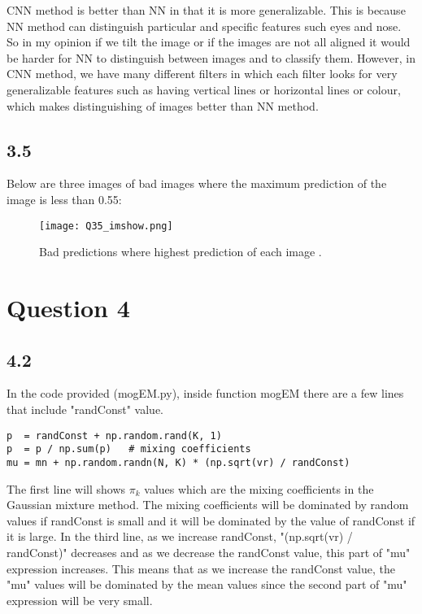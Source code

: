\documentclass[10pt]{article}
\begin{document}
CNN method is better than NN in that it is more generalizable. This is because NN method can distinguish particular and specific features such eyes and nose. So in my opinion if we tilt the image or if the images are not all aligned it would be harder for NN to distinguish between images and to classify them. However, in CNN method, we have many different filters in which each filter looks for very generalizable features such as having vertical lines or horizontal lines or colour, which makes distinguishing of images better than NN method.

\subsection*{3.5}
Below are three images of bad images where the maximum prediction of the image is less than 0.55:
\begin{figure}[H]
	\centering
	\texttt{[image: Q35\_imshow.png]}
	\caption{Bad predictions where highest prediction of each image .}
	\label{fig:}
\end{figure}


\section*{Question 4}
\subsection*{4.2}
In the code provided (mogEM.py), inside function mogEM there are a few lines that include "randConst" value.
\begin{verbatim}
p  = randConst + np.random.rand(K, 1)
p  = p / np.sum(p)   # mixing coefficients
mu = mn + np.random.randn(N, K) * (np.sqrt(vr) / randConst)
\end{verbatim}
The first line will shows $\pi_k$ values which are the mixing coefficients in the Gaussian mixture method. The mixing coefficients will be dominated by random values if randConst is small and it will be dominated by the value of randConst if it is large.
In the third line, as we increase randConst, "(np.sqrt(vr) / randConst)" decreases and as we decrease the randConst value, this part of "mu" expression increases. This means that as we increase the randConst value, the "mu" values will be dominated by the mean values since the second part of "mu" expression will be very small.
\end{document}
